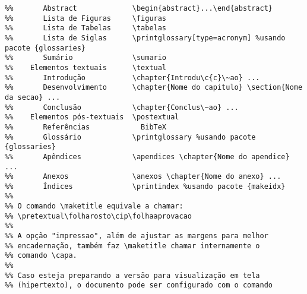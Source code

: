\begin{verbatim}
%%       Abstract             \begin{abstract}...\end{abstract}
%%       Lista de Figuras     \figuras
%%       Lista de Tabelas     \tabelas
%%       Lista de Siglas      \printglossary[type=acronym] %usando pacote {glossaries}
%%       Sumário              \sumario
%%    Elementos textuais      \textual
%%       Introdução           \chapter{Introdu\c{c}\~ao} ...
%%       Desenvolvimento      \chapter{Nome do capitulo} \section{Nome da secao} ...
%%       Conclusão            \chapter{Conclus\~ao} ...
%%    Elementos pós-textuais  \postextual
%%       Referências            BibTeX
%%       Glossário            \printglossary %usando pacote {glossaries}
%%       Apêndices            \apendices \chapter{Nome do apendice} ...
%%       Anexos               \anexos \chapter{Nome do anexo} ...
%%       Índices              \printindex %usando pacote {makeidx}
%%
%% O comando \maketitle equivale a chamar:
%% \pretextual\folharosto\cip\folhaaprovacao
%%
%% A opção "impressao", além de ajustar as margens para melhor
%% encadernação, também faz \maketitle chamar internamente o
%% comando \capa.
%%
%% Caso esteja preparando a versão para visualização em tela
%% (hipertexto), o documento pode ser configurado com o comando

\end{verbatim}
